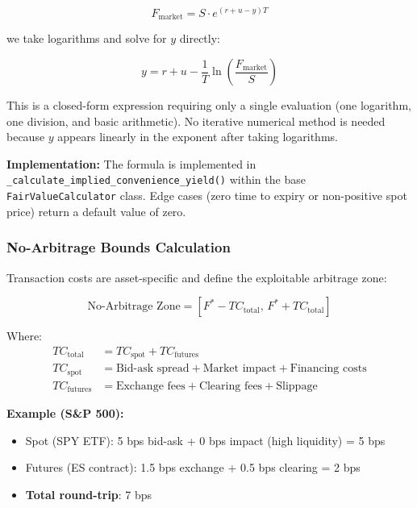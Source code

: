 \documentclass[12pt,a4paper]{article}
\begin{document}
\begin{equation}
F_{\text{market}} = S \cdot e^{(r + u - y)T}
\end{equation}

we take logarithms and solve for $y$ directly:

\begin{equation}
y = r + u - \frac{1}{T} \ln\!\left(\frac{F_{\text{market}}}{S}\right)
\end{equation}

This is a closed-form expression requiring only a single evaluation (one logarithm, one division, and basic arithmetic). No iterative numerical method is needed because $y$ appears linearly in the exponent after taking logarithms.

\textbf{Implementation:} The formula is implemented in \texttt{\_calculate\_implied\_convenience\_yield()} within the base \texttt{FairValueCalculator} class. Edge cases (zero time to expiry or non-positive spot price) return a default value of zero.

\subsubsection{No-Arbitrage Bounds Calculation}

Transaction costs are asset-specific and define the exploitable arbitrage zone:

\begin{equation}
\text{No-Arbitrage Zone} = \left[ F^* - TC_{\text{total}}, \, F^* + TC_{\text{total}} \right]
\end{equation}

Where:
\begin{align*}
TC_{\text{total}} &= TC_{\text{spot}} + TC_{\text{futures}} \\
TC_{\text{spot}} &= \text{Bid-ask spread} + \text{Market impact} + \text{Financing costs} \\
TC_{\text{futures}} &= \text{Exchange fees} + \text{Clearing fees} + \text{Slippage}
\end{align*}

\textbf{Example (S\&P 500):}
\begin{itemize}
    \item Spot (SPY ETF): 5 bps bid-ask + 0 bps impact (high liquidity) = 5 bps
    \item Futures (ES contract): 1.5 bps exchange + 0.5 bps clearing = 2 bps
    \item \textbf{Total round-trip}: 7 bps
\end{itemize}
\end{document}
